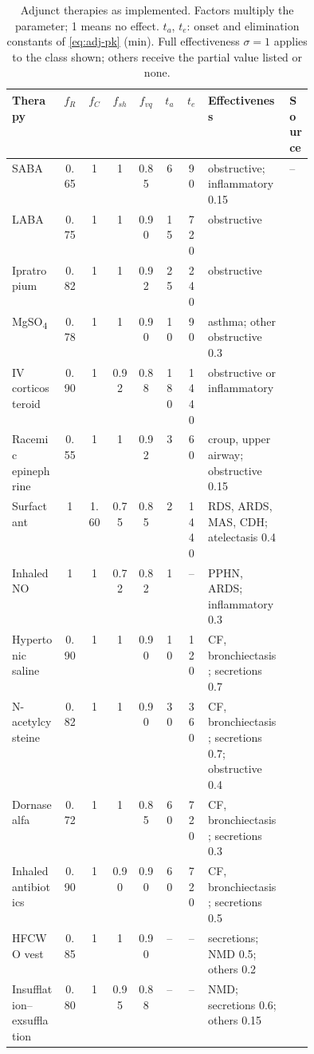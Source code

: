 \begin{table}[htbp]\centering\scriptsize\setlength{\tabcolsep}{3pt}
\caption{Adjunct therapies as implemented. Factors multiply the parameter; 1 means no effect. $t_a$, $t_e$: onset and elimination constants of \cref{eq:adj-pk} (min). Full effectiveness $\sigma=1$ applies to the class shown; others receive the partial value listed or none.}
\label{tab:adj-defs}
\begin{tabular}{@{}>{\raggedright\arraybackslash}p{0.17\linewidth}cccccc>{\raggedright\arraybackslash}p{0.27\linewidth}l@{}}
\toprule
Therapy & $f_R$ & $f_C$ & $f_{sh}$ & $f_{vq}$ & $t_a$ & $t_e$ & Effectiveness & Source\\\midrule
SABA & 0.65 & 1 & 1 & 0.85 & 6 & 90 & obstructive; inflammatory 0.15 & --\\
LABA & 0.75 & 1 & 1 & 0.90 & 15 & 720 & obstructive & \citep{calverley2003}\\
Ipratropium & 0.82 & 1 & 1 & 0.92 & 25 & 240 & obstructive & \citep{rennard1996,gross1987}\\
MgSO\textsubscript{4} & 0.78 & 1 & 1 & 0.90 & 10 & 90 & asthma; other obstructive 0.3 & \citep{rowe2000}\\
IV corticosteroid & 0.90 & 1 & 0.92 & 0.88 & 180 & 1440 & obstructive or inflammatory & \citep{niewoehner1999}\\
Racemic epinephrine & 0.55 & 1 & 1 & 0.92 & 3 & 60 & croup, upper airway; obstructive 0.15 & \citep{westley1978}\\
Surfactant & 1 & 1.60 & 0.75 & 0.85 & 2 & 1440 & RDS, ARDS, MAS, CDH; atelectasis 0.4 & \citep{engle2008}\\
Inhaled NO & 1 & 1 & 0.72 & 0.82 & 1 & -- & PPHN, ARDS; inflammatory 0.3 & \citep{clark2000}\\
Hypertonic saline & 0.90 & 1 & 1 & 0.90 & 10 & 120 & CF, bronchiectasis; secretions 0.7 & \citep{donaldson2006}\\
N-acetylcysteine & 0.82 & 1 & 1 & 0.90 & 30 & 360 & CF, bronchiectasis; secretions 0.7; obstructive 0.4 & \citep{sheffner1963,decramer2005}\\
Dornase alfa & 0.72 & 1 & 1 & 0.85 & 60 & 720 & CF, bronchiectasis; secretions 0.3 & \citep{fuchs1994}\\
Inhaled antibiotics & 0.90 & 1 & 0.90 & 0.90 & 60 & 720 & CF, bronchiectasis; secretions 0.5 & \citep{ramsey1999}\\
HFCWO vest & 0.85 & 1 & 1 & 0.90 & -- & -- & secretions; NMD 0.5; others 0.2 & \citep{nicolini2013}\\
Insufflation--exsufflation & 0.80 & 1 & 0.95 & 0.88 & -- & -- & NMD; secretions 0.6; others 0.15 & \citep{bach1993}\\

\end{tabular}
\end{table}
